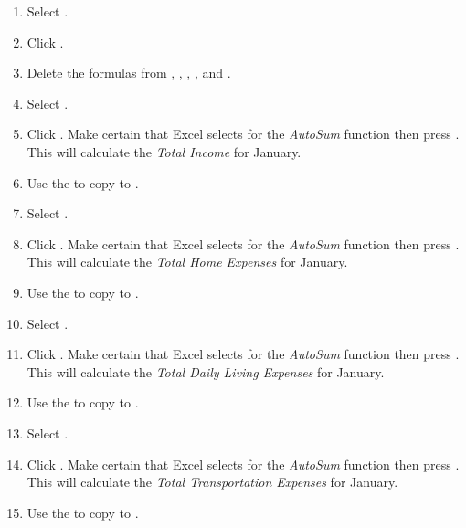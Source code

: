 \begin{enumbox}
\begin{enumerate}
		\item Select .
		\item Click . 
		\item Delete the formulas from , , , , and .
	
		\item Select .
		\item Click . Make certain that Excel selects  for the \textit{AutoSum} function then press . This will calculate the \textit{Total Income} for January.
		\item Use the  to copy  to .
	
		\item Select .
		\item Click . Make certain that Excel selects  for the \textit{AutoSum} function then press . This will calculate the \textit{Total Home Expenses} for January.
		\item Use the  to copy  to .
		
		\item Select .
		\item Click . Make certain that Excel selects  for the \textit{AutoSum} function then press . This will calculate the \textit{Total Daily Living Expenses} for January.
		\item Use the  to copy  to .
		
		\item Select .
		\item Click . Make certain that Excel selects  for the \textit{AutoSum} function then press . This will calculate the \textit{Total Transportation Expenses} for January.
		\item Use the  to copy  to .
	

\end{enumerate}
\end{enumbox}
